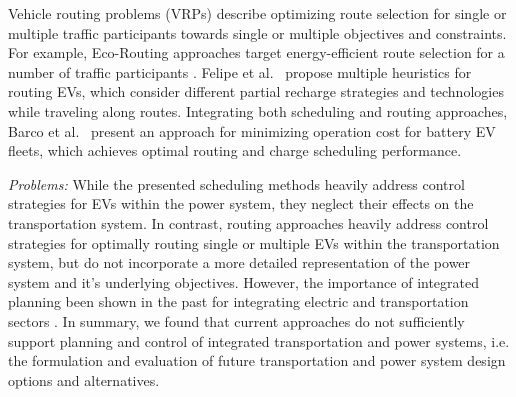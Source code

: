 Vehicle routing problems (VRPs) describe optimizing route selection for single or multiple traffic participants towards single or multiple objectives and constraints. For example, Eco-Routing approaches target energy-efficient route selection for a number of traffic participants \cite{ericsson2006optimizing}.
Felipe et al.~\cite{felipe2014heuristic} propose multiple heuristics for routing EVs, which consider different partial recharge strategies and technologies while traveling along routes. 
Integrating both scheduling and routing approaches, Barco et al.~\cite{barco2013optimal} present an approach for minimizing operation cost for battery EV fleets, which achieves optimal routing and charge scheduling performance.


\textit{Problems:} While the presented scheduling methods heavily address control strategies for EVs within the power system, they neglect their effects on the transportation system. In contrast, routing approaches heavily address control strategies for optimally routing single or multiple EVs within the transportation system, but do not incorporate a more detailed representation of the power system and it's underlying objectives. However, the importance of integrated planning been shown in the past for integrating electric and transportation sectors \cite{mathiesen2008integrated}. In summary, we found that current approaches do not sufficiently support planning and control of integrated transportation and power systems, i.e. the formulation and evaluation of future transportation and power system design options and alternatives.



